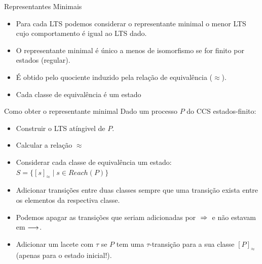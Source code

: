 \documentclass[aspectratio=169]{beamer}
\begin{document}
\begin{frame}{Representantes Minimais}
\begin{itemize}[<+->]
	\item Para cada LTS podemos considerar o  \alert{representante minimal} o menor LTS cujo comportamento é igual ao LTS dado.
\item O representante minimal é único a menos de isomorfismo se for finito por estados (regular).
\item É obtido pelo quociente induzido pela relação de equivalência ($\approx$).
\item Cada classe de equivalência é um estado
\end{itemize}


	

\end{frame}
\begin{frame}{Como obter o representante minimal}
Dado um processo $P$ do CCS estados-finito:
\begin{itemize}
	\item Construir o LTS atíngivel de $P$.
\item Calcular a relação $\approx$
\item Considerar cada classe de equivalência um estado: $S=\{[s]_{\approx}\mid s\in Reach(P)\}$
\item Adicionar  transições entre duas classes sempre que uma transição exista entre os elementos da respectiva classe.
\item Podemos apagar as transições que seriam adicionadas por $\;\Rightarrow\;$ e não estavam em $\longrightarrow$.
\item Adicionar um lacete com $\tau$ se $P$ tem uma $\tau$-transição para a sua classe $[P]_\approx$ (apenas para o estado inicial!).
\end{itemize}	
\end{frame}
\end{document}
